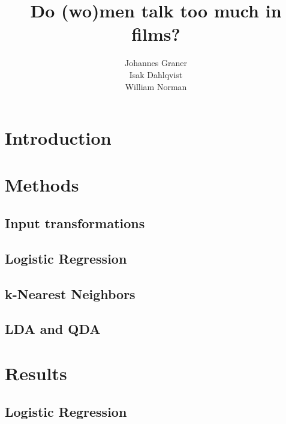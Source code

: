 \documentclass{article}
\title{Do (wo)men talk too much in films?}
\author{%
  Johannes Graner \\
  \And
  Isak Dahlqvist \\
  \AND
  William Norman \\
}
\begin{document}
\maketitle

\section{Introduction}



\section{Methods}



\subsection{Input transformations}



\subsection{Logistic Regression}



\subsection{k-Nearest Neighbors}



\subsection{LDA and QDA}



\section{Results}



\subsection{Logistic Regression}


\end{document}
